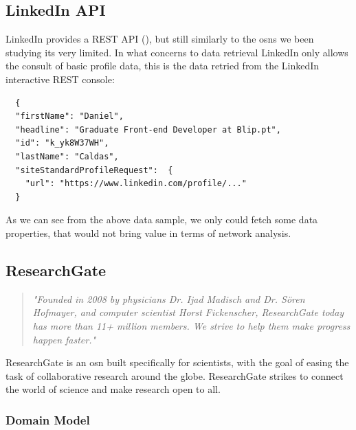 \subsection*{LinkedIn API}
LinkedIn provides a REST API (\cite{linkapi}), but still similarly to the \glspl{osn} we been studying its very limited. In what concerns to data retrieval LinkedIn only allows
the consult of basic profile data, this is the data retried from the LinkedIn interactive REST console:\\

\begin{verbatim}
  {
  "firstName": "Daniel",
  "headline": "Graduate Front-end Developer at Blip.pt",
  "id": "k_yk8W37WH",
  "lastName": "Caldas",
  "siteStandardProfileRequest":  {
    "url": "https://www.linkedin.com/profile/..."
  }
\end{verbatim}

\indent As we can see from the above data sample, we only could fetch some data properties, that would not bring value in terms of network analysis.

\subsection{ResearchGate}

\begin{quote}
\textit{"Founded in 2008 by physicians Dr. Ijad Madisch and Dr. Sören Hofmayer, and computer scientist
Horst Fickenscher, ResearchGate today has more than 11+ million members. We strive to help them make progress happen faster."} \cite{rgate}
\end{quote}

ResearchGate is an \gls{osn} built specifically for scientists, with the goal of easing the task of collaborative research around the globe. ResearchGate
strikes to connect the world of science and make research open to all.
\clearpage

\subsubsection*{Domain Model}

